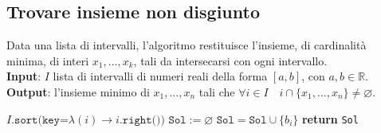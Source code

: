 \documentclass[14pt]{extreport}
\theoremstyle{definition}
\theoremstyle{definition}
\begin{document}
\subsection{Trovare insieme non disgiunto}

\begin{algorithm}[H]
    \caption{
        Data una lista di intervalli, l'algoritmo restituisce l'insieme, di cardinalità minima, di interi $x_1, \ldots, x_k$, tali da intersecarsi con ogni intervallo.\\
        \textbf{Input}: $I$ lista di intervalli di numeri reali della forma $[a, b]$, con $a, b \in \mathbb{R}$.\\
        \textbf{Output}: l'insieme minimo di $x_1, \ldots, x_n$ tali che $\forall i \in I \quad i \cap \{x_1, \ldots, x_n\} \neq \varnothing$.
    }

    \begin{algorithmic}[1]
            \State $I\texttt{.sort(key=}\lambda (i) \rightarrow i\texttt{.right())}$ 
            \State $\texttt{Sol}:= \varnothing$
                    \State $\texttt{Sol} = \texttt{Sol} \cup \{b_i\}$
                \EndIf
            \EndFor
            \State \textbf{return} \texttt{Sol}
        \EndFunction
    \end{algorithmic}
\end{algorithm}
\end{document}
